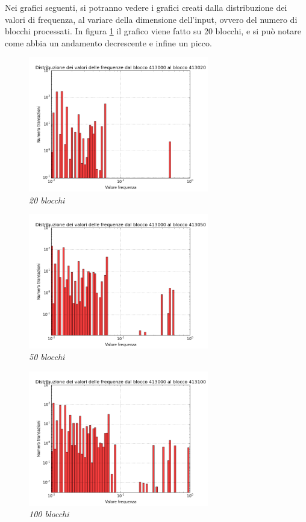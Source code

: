 Nei grafici seguenti, si potranno vedere i grafici creati dalla distribuzione dei valori di frequenza, al variare della dimensione dell'input, ovvero del numero di blocchi processati. In figura \ref{fig:hist20b} il grafico viene fatto su 20 blocchi, e si può notare come abbia un andamento decrescente e infine un picco.

\begin{figure}[htbp]
	\centering
		\includegraphics[width=0.7\textwidth]{figure/hist20b}
		\caption{\textit{20 blocchi}\label{fig:hist20b}}
\end{figure}
	
\begin{figure}[htbp]
	\centering
		\includegraphics[width=0.7\textwidth]{figure/hist50b}
		\caption{\textit{50 blocchi}\label{fig:hist50b}}
\end{figure}

\begin{figure}[htbp]
	\centering
		\includegraphics[width=0.7\textwidth]{figure/hist100b}
		\caption{\textit{100 blocchi}\label{fig:hist100b}}
\end{figure}
	
